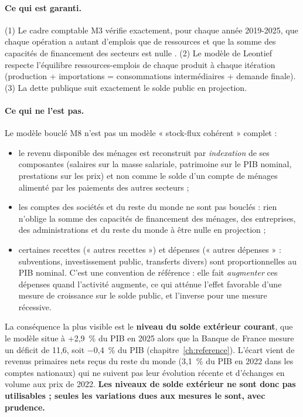 \paragraph{Ce qui est garanti.} (1) Le cadre comptable M3 vérifie exactement, pour chaque année 2019-2025, que chaque
opération a autant d'emplois que de ressources et que la somme des capacités de financement des secteurs est nulle
. (2) Le modèle de Leontief respecte l'équilibre ressources-emplois de chaque produit à chaque itération
(production + importations = consommations intermédiaires + demande finale). (3) La dette publique suit exactement
le solde public en projection.

\paragraph{Ce qui ne l'est pas.} Le modèle bouclé M8 n'est pas un modèle « stock-flux cohérent » complet :
\begin{itemize}
\item le revenu disponible des ménages est reconstruit par \emph{indexation} de ses composantes (salaires sur la masse
salariale, patrimoine sur le PIB nominal, prestations sur les prix) et non comme le solde d'un compte de ménages
alimenté par les paiements des autres secteurs ;
\item les comptes des sociétés et du reste du monde ne sont pas bouclés : rien n'oblige la somme des capacités de
financement des ménages, des entreprises, des administrations et du reste du monde à être nulle en projection ;
\item certaines recettes (« autres recettes ») et dépenses (« autres dépenses » : subventions, investissement public,
transferts divers) sont proportionnelles au PIB nominal. C'est une convention de référence : elle fait
\emph{augmenter} ces dépenses quand l'activité augmente, ce qui atténue l'effet favorable d'une mesure de croissance
sur le solde public, et l'inverse pour une mesure récessive.
\end{itemize}
La conséquence la plus visible est le \textbf{niveau du solde extérieur courant}, que le modèle situe à +2,9~\% du PIB
en 2025 alors que la Banque de France mesure un déficit de 11,6\md, soit $-$0,4~\% du PIB (chapitre~\ref{ch:reference}).
L'écart vient de revenus primaires nets reçus du reste du monde (3,1~\% du PIB en 2022 dans les comptes nationaux) qui
ne suivent pas leur évolution récente et d'échanges en volume aux prix de 2022. \textbf{Les niveaux de solde extérieur ne
sont donc pas utilisables ; seules les variations dues aux mesures le sont, avec prudence.}

